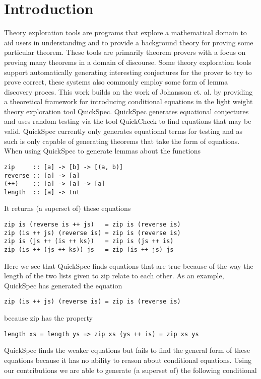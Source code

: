 \section{Introduction}
Theory exploration tools are programs that
explore a mathematical domain to aid users in
understanding and to provide a background theory
for proving some particular theorem\cite{Johansson2014}. 
These tools are primarily theorem provers with a focus
on proving many theorems in a domain of discourse.
Some theory exploration tools support automatically generating
interesting conjectures for the prover to try to prove correct,
these systems also commonly employ some form of lemma discovery proces\cite{heras2013}.
This work builds on the work of Johansson et. al. \cite{Johansson2014}
by providing a theoretical framework for introducing conditional
equations in the light weight theory exploration tool QuickSpec\cite{Claessen2010}.
QuickSpec generates equational conjectures and uses random testing via the tool QuickCheck\cite{Claessen2000}
to find equations that may be valid. QuickSpec currently only generates
equational terms for testing and as such is only capable of generating
theorems that take the form of equations. 
When using QuickSpec to generate lemmas about the functions
\begin{verbatim}
zip     :: [a] -> [b] -> [(a, b)]
reverse :: [a] -> [a]
(++)    :: [a] -> [a] -> [a]
length  :: [a] -> Int
\end{verbatim}
It returns (a superset of) these equations
\begin{verbatim}
zip is (reverse is ++ js)   = zip is (reverse is)
zip (is ++ js) (reverse is) = zip is (reverse is)
zip is (js ++ (is ++ ks))   = zip is (js ++ is)
zip (is ++ (js ++ ks)) js   = zip (is ++ js) js
\end{verbatim}
Here we see that QuickSpec finds equations that are true
because of the way the length of the two lists given to zip relate
to each other. As an example, QuickSpec has generated the equation
\begin{verbatim}zip (is ++ js) (reverse is) = zip is (reverse is)\end{verbatim}
because zip has the property \begin{verbatim}length xs = length ys => zip xs (ys ++ is) = zip xs ys\end{verbatim}
QuickSpec finds the weaker equations but fails to find the general form
of these equations because it has no ability to reason about
conditional equations.
Using our contributions we are able to generate (a superset of) the following conditional
